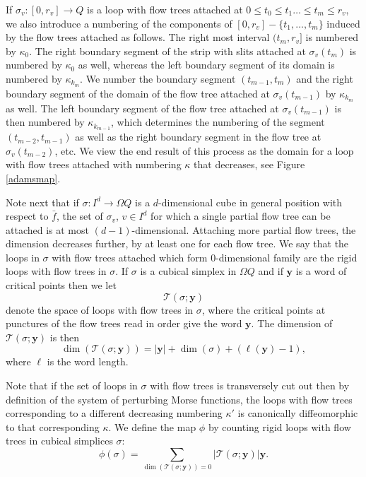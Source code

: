 \documentclass{gtpart}
\begin{document}
If $\sigma_{v}\colon [0,r_{v}]\to Q$ is a loop with flow trees attached at $0\le t_{0}\le t_{1}\dots\le t_{m}\le r_{v}$, we also introduce a numbering of the components of $[0,r_{v}]-\{t_{1},\dots,t_{m}\}$ induced by the flow trees attached as follows. The right most interval $(t_{m},r_{v}]$ is numbered by $\kappa_{0}$. The right boundary segment of the strip with slits attached at $\sigma_{v}(t_{m})$ is numbered by $\kappa_{0}$ as well, whereas the left boundary segment of its domain is numbered by $\kappa_{k_{m}}$. 
We number the boundary segment $(t_{m-1},t_{m})$ and the right boundary segment of the domain of the flow tree attached at $\sigma_{v}(t_{m-1})$ by $\kappa_{k_{m}}$ as well. 
The left boundary segment of the flow tree attached at $\sigma_{v}(t_{m-1})$ is then numbered by $\kappa_{k_{m-1}}$, 
which determines the numbering of the segment $(t_{m-2},t_{m-1})$ as well as the right boundary
segment in the flow tree at $\sigma_{v}(t_{m-2})$, etc. We view the end result of this process as
the domain for a loop with flow trees attached with numbering $\kappa$ that decreases, see Figure
\ref{adamsmap}. 

Note next that if $\sigma\colon I^{d}\to\Omega Q$ is a $d$-dimensional cube in general
position with respect to $\bar f$, the set of $\sigma_{v}$, $v\in I^{d}$ for which a single partial
flow tree can be attached is at most $(d-1)$-dimensional. Attaching more partial flow trees, the
dimension decreases further, by at least one for each flow tree. We say that the loops in $\sigma$
with flow trees attached which form $0$-dimensional family are the rigid loops with flow trees in
$\sigma$. If $\sigma$ is a cubical simplex in $\Omega Q$ and if $\mathbf{y}$ is a word of critical points then we let 
\[
\mathcal{T}(\sigma;\mathbf{y})
\]
denote the space of loops with flow trees in $\sigma$, where the critical points at punctures of the flow trees read in order give the word $\mathbf{y}$. The dimension of $\mathcal{T}(\sigma;\mathbf{y})$ is then
\[
\dim(\mathcal{T}(\sigma;\mathbf{y}))=|\mathbf{y}|+\dim(\sigma)+(\ell(\mathbf{y})-1),
\]
where $\ell$ is the word length.

Note that if the set of loops in $\sigma$ with flow trees is transversely cut out then by definition
of the system of perturbing Morse functions, the loops with flow trees corresponding to a different
decreasing numbering $\kappa'$ is canonically diffeomorphic to that corresponding $\kappa$. We
define the map $\phi$ by counting rigid loops with flow trees in cubical simplices $\sigma$:
\begin{equation}\label{eq:deflooptotree}
\phi(\sigma)=\sum_{\dim(\mathcal{T}(\sigma;\mathbf{y}))=0}|\mathcal{T}(\sigma;\mathbf{y})|\mathbf{y}.
\end{equation}
\end{document}

